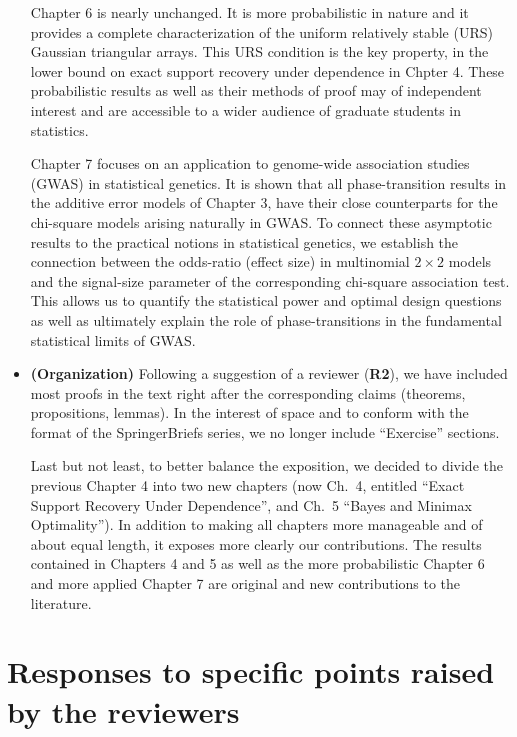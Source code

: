 \documentclass[11pt]{article}
\begin{document}
\begin{itemize}
   Chapter 6 is nearly unchanged. It is more probabilistic in nature and it provides a complete characterization of the uniform relatively stable (URS) Gaussian 
   triangular arrays.  This URS condition is the key property, in the lower bound on exact support recovery under dependence in Chpter 4. 
   These probabilistic results as well as their methods of proof may of independent interest and are accessible to a wider audience of graduate students in statistics. 
   
   Chapter 7 focuses on an application to genome-wide association studies (GWAS) in statistical genetics.  It is shown that all phase-transition results in the 
    additive error models of Chapter 3, have their close counterparts for the chi-square models arising naturally in GWAS. To connect these
    asymptotic results to the practical notions in statistical genetics, we establish the connection between the odds-ratio (effect size) in multinomial 
    $2\times 2$ models
    and the signal-size parameter of the corresponding chi-square association test.  This allows us to quantify the statistical power and
     optimal design questions as well as ultimately explain the role of phase-transitions in the fundamental statistical limits of GWAS.
    
  
 
  \item {\bf (Organization)} Following a suggestion of a reviewer ({\bf R2}),  we have included most proofs 
  in the text right after the corresponding claims (theorems, propositions, lemmas).  In the interest of space and to conform with the format of
  the SpringerBriefs series, we no longer include ``Exercise'' sections. 
  
  Last but not least, to better balance the exposition, we decided to divide the previous
  Chapter 4 into two new chapters (now Ch.\ 4, entitled ``Exact Support Recovery Under Dependence'', 
  and Ch.\ 5 ``Bayes and Minimax Optimality'').  In addition to making all chapters more manageable and of about equal length, it exposes more
  clearly our contributions.  The results contained in Chapters 4 and 5 as well as the more probabilistic Chapter 6 and more applied Chapter 7 are 
  original and new contributions to the literature.
  
 \end{itemize}
 
 
 \section*{Responses to specific points raised by the reviewers}
\end{document}
